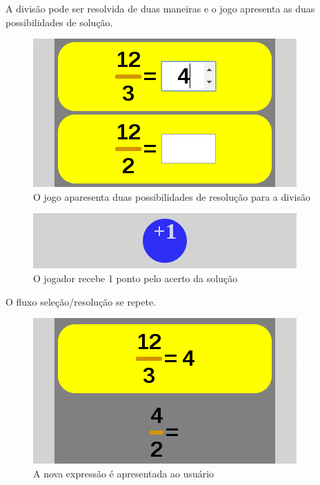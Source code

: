 A divisão pode ser resolvida de duas maneiras e o jogo apresenta as duas possibilidades de solução.

\begin{figure}[H]
	\caption{\label{xp_7}O jogo aparesenta duas possibilidades de resolução para a divisão}
	\begin{center}
	    \includegraphics[scale=1]{xp_4_7_rightans_2.png}
	\end{center}
\end{figure}

\begin{figure}[H]
	\caption{\label{score_1_2}O jogador recebe 1 ponto pelo acerto da solução}
	\begin{center}
	    \includegraphics[scale=1]{score_1.png}
	\end{center}
\end{figure}

O fluxo seleção/resolução se repete.

\begin{figure}[H]
	\caption{\label{xp_8}A nova expressão é apresentada ao usuário}
	\begin{center}
	    \includegraphics[scale=1]{xp_4_8.png}
	\end{center}
\end{figure}

